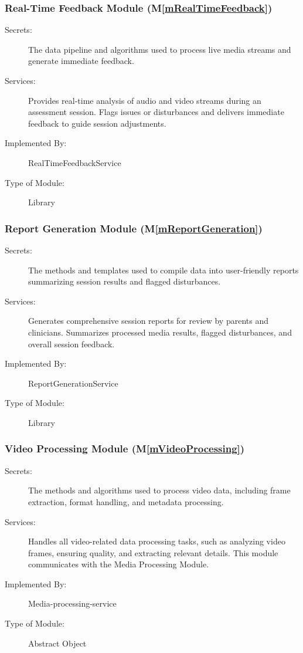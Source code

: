 \documentclass[12pt, titlepage]{article}
\newcommand{\mref}[1]{M\ref{#1}}
\begin{document}
\subsubsection{Real-Time Feedback Module (\mref{mRealTimeFeedback})}

\begin{description}
\item[Secrets:] The data pipeline and algorithms used to process live media streams and generate immediate feedback.
\item[Services:] Provides real-time analysis of audio and video streams during an assessment session. Flags issues or disturbances and delivers immediate feedback to guide session adjustments.
\item[Implemented By:] RealTimeFeedbackService
\item[Type of Module:] Library
\end{description}

\subsubsection{Report Generation Module (\mref{mReportGeneration})}

\begin{description}
\item[Secrets:] The methods and templates used to compile data into user-friendly reports summarizing session results and flagged disturbances.
\item[Services:] Generates comprehensive session reports for review by parents and clinicians. Summarizes processed media results, flagged disturbances, and overall session feedback.
\item[Implemented By:] ReportGenerationService
\item[Type of Module:] Library
\end{description}

\subsubsection{Video Processing Module (\mref{mVideoProcessing})}
\begin{description}
\item[Secrets:] The methods and algorithms used to process video data, including frame extraction, format handling, and metadata processing.
\item[Services:] Handles all video-related data processing tasks, such as analyzing video frames, ensuring quality, and extracting relevant details. This module communicates with the Media Processing Module.
\item[Implemented By:] Media-processing-service
\item[Type of Module:]  Abstract Object
\end{description}
\end{document}
